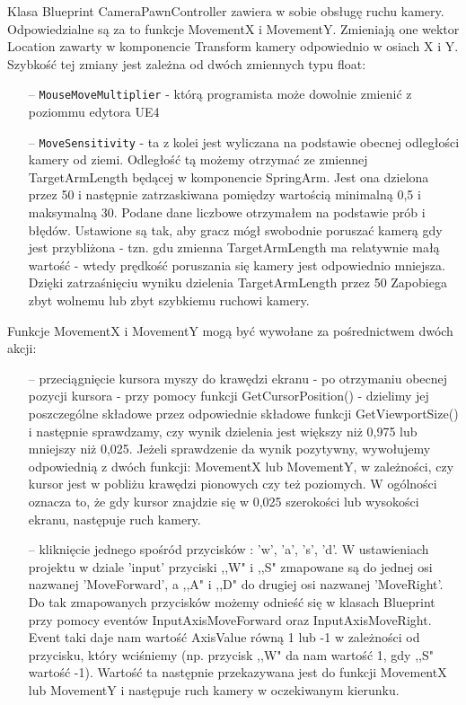 \documentclass[12pt]{report}
\begin{document}
Klasa Blueprint CameraPawnController zawiera w sobie obsługę ruchu kamery. Odpowiedzialne są za to funkcje MovementX i MovementY. Zmieniają one wektor Location zawarty w komponencie Transform kamery odpowiednio w osiach X i Y. Szybkość tej zmiany jest zależna od dwóch zmiennych typu float: 
\begin{itemize}
\item[--] \texttt{MouseMoveMultiplier} - którą programista może dowolnie zmienić z poziommu edytora UE4
\item[--] \texttt{MoveSensitivity} - ta z kolei jest wyliczana na podstawie obecnej odległości kamery od ziemi. Odległość tą możemy otrzymać ze zmiennej TargetArmLength będącej w komponencie SpringArm. Jest ona dzielona przez 50 i następnie zatrzaskiwana pomiędzy wartością minimalną 0,5 i maksymalną 30. Podane dane liczbowe otrzymałem na podstawie prób i błędów. Ustawione są tak, aby gracz mógł swobodnie poruszać kamerą gdy jest przybliżona - tzn. gdu zmienna TargetArmLength ma relatywnie małą   wartość - wtedy prędkość poruszania się kamery jest odpowiednio mniejsza. Dzięki zatrzaśnięciu wyniku dzielenia TargetArmLength przez 50 Zapobiega zbyt wolnemu lub zbyt szybkiemu ruchowi kamery.
\end{itemize}



Funkcje MovementX i MovementY mogą być wywołane za pośrednictwem dwóch akcji:

\begin{itemize}
\item[--] przeciągnięcie kursora myszy do krawędzi ekranu - po otrzymaniu obecnej pozycji kursora - przy pomocy funkcji GetCursorPosition() - dzielimy jej poszczególne składowe przez odpowiednie składowe funkcji GetViewportSize() i następnie sprawdzamy, czy wynik dzielenia jest większy niż 0,975 lub mniejszy niż 0,025. Jeżeli sprawdzenie da wynik pozytywny, wywołujemy odpowiednią z dwóch funkcji: MovementX lub MovementY, w zależności, czy kursor jest w pobliżu krawędzi pionowych czy też poziomych. W ogólności oznacza to, że gdy kursor znajdzie się w 0,025 szerokości lub wysokości ekranu, następuje ruch kamery. 
\item[--] kliknięcie jednego spośród przycisków : 'w', 'a', 's', 'd'. W ustawieniach projektu w dziale 'input' przyciski ,,W" i ,,S" zmapowane są do jednej osi nazwanej 'MoveForward', a ,,A" i ,,D" do drugiej osi nazwanej 'MoveRight'. Do tak zmapowanych przycisków możemy odnieść się w klasach Blueprint przy pomocy eventów InputAxisMoveForward oraz InputAxisMoveRight. Event taki daje nam wartość AxisValue równą 1 lub -1 w zależności od przycisku, który wciśniemy (np. przycisk ,,W" da nam wartość 1, gdy ,,S" wartość -1). Wartość ta następnie przekazywana jest do funkcji MovementX lub MovementY i następuje ruch kamery w oczekiwanym kierunku.
\end{itemize}
\end{document}
